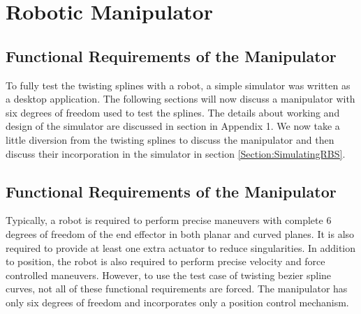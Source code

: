 \section{Robotic Manipulator}\label{Chapter:RoboticManipulator}
{
    \subsection{Functional Requirements of the Manipulator}
    {
        To fully test the twisting splines with a robot, a simple simulator was written as a desktop application. The following sections will now discuss a manipulator with six degrees of freedom used to test the splines. The details about working and design of the simulator are discussed in section \label{Chapter:Drogon} in Appendix 1. We now take a little diversion from the twisting splines to discuss the manipulator and then discuss their incorporation in the simulator in section \ref{Section:SimulatingRBS}.
    }
    \subsection{Functional Requirements of the Manipulator}
    {
        Typically, a robot is required to perform precise maneuvers with complete $6$ degrees of freedom of the end effector in both planar and curved planes. It is also required to provide at least one extra actuator to reduce singularities. In addition to position, the robot is also required to perform precise velocity and force controlled maneuvers. However, to use the test case of twisting bezier spline curves, not all of these functional requirements are forced. The manipulator has only six degrees of freedom and incorporates only a position control mechanism.
    }
}
